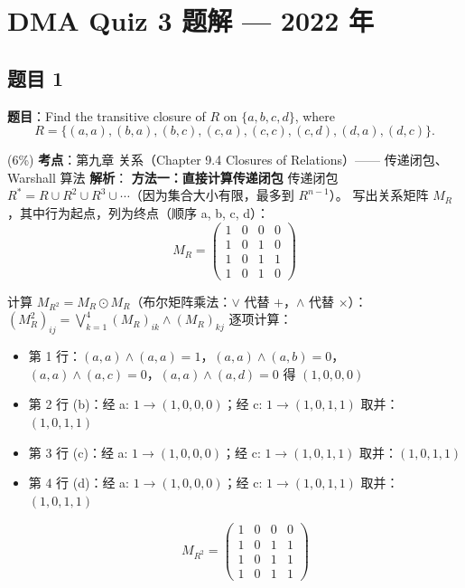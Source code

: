 \documentclass[10pt,a4paper,openany]{ctexbook}
\theoremstyle{definition}
\theoremstyle{remark}
\begin{document}
\section{DMA Quiz 3 题解 — 2022 年}

\subsection{题目 1}

\textbf{题目}：Find the transitive closure of $R$ on $\{a, b, c, d\}$, where
\[
R = \{(a, a), (b, a), (b, c), (c, a), (c, c), (c, d), (d, a), (d, c)\}.
\]

(6\%)
\textbf{考点}：第九章 关系（Chapter 9.4 Closures of Relations）—— 传递闭包、Warshall 算法
\textbf{解析}：
\textbf{方法一：直接计算传递闭包}
传递闭包 $R^* = R \cup R^2 \cup R^3 \cup \cdots$（因为集合大小有限，最多到 $R^{n-1}$）。
写出关系矩阵 $M_R$，其中行为起点，列为终点（顺序 a, b, c, d）：
\[
M_R = \begin{pmatrix}
1 & 0 & 0 & 0 \\
1 & 0 & 1 & 0 \\
1 & 0 & 1 & 1 \\
1 & 0 & 1 & 0
\end{pmatrix}
\]

计算 $M_{R^2} = M_R \odot M_R$（布尔矩阵乘法：$\lor$ 代替 $+$，$\land$ 代替 $\times$）：
$(M_R^2)_{ij} = \bigvee_{k=1}^{4} (M_R)_{ik} \land (M_R)_{kj}$
逐项计算：
\begin{itemize}
\item 第 1 行：$(a,a) \land (a,a) = 1$，$(a,a) \land (a,b)=0$，$(a,a) \land (a,c)=0$，$(a,a) \land (a,d)=0$
得 $(1,0,0,0)$

\item 第 2 行 (b)：经 a: $1 \to (1,0,0,0)$；经 c: $1 \to (1,0,1,1)$
取并：$(1,0,1,1)$

\item 第 3 行 (c)：经 a: $1 \to (1,0,0,0)$；经 c: $1 \to (1,0,1,1)$
取并：$(1,0,1,1)$

\item 第 4 行 (d)：经 a: $1 \to (1,0,0,0)$；经 c: $1 \to (1,0,1,1)$
取并：$(1,0,1,1)$


\[
M_{R^2} = \begin{pmatrix}
1 & 0 & 0 & 0 \\
1 & 0 & 1 & 1 \\
1 & 0 & 1 & 1 \\
1 & 0 & 1 & 1
\end{pmatrix}
\]


\end{itemize}
\end{document}
